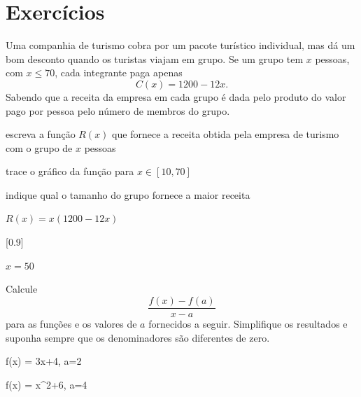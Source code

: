 \section{Exercícios}

\begin{exercises*}

\begin{exercise}
  Uma companhia de turismo cobra  por um pacote turístico
  individual, mas dá um bom desconto quando os turistas viajam em grupo. Se um
  grupo tem $x$ pessoas, com $x \leq 70$, cada integrante paga apenas
  \[
    C(x) = 1200 - 12x.
  \]
  Sabendo que a receita da empresa em cada grupo é dada pelo produto do valor
  pago por pessoa pelo número de membros do grupo.
  \begin{alphalist}
    \item escreva a função $R(x)$ que fornece a receita obtida pela empresa de
          turismo com o grupo de $x$ pessoas
    \item trace o gráfico da função para $x \in [10, 70]$
    \item indique qual o tamanho do grupo fornece a maior receita
  \end{alphalist}

  \begin{answer}
    \begin{alphalist}
      \item $R(x)=x(1200-12x)$
      \item {}[0.9]
      \item $x=50$
    \end{alphalist}
  \end{answer}
\end{exercise}

\begin{exercise}
  Calcule
  \[
    \frac{f(x)-f(a)}{x-a}
  \]
  para as funções e os valores de $a$ fornecidos a seguir. Simplifique os
  resultados e suponha sempre que os denominadores são diferentes de zero.
  \begin{mathlist}
    \item f(x) = 3x+4,  \qquad a=2
    \item f(x) = x^2+6, \qquad a=4
  \end{mathlist}


\end{exercise}
\end{exercises*}
